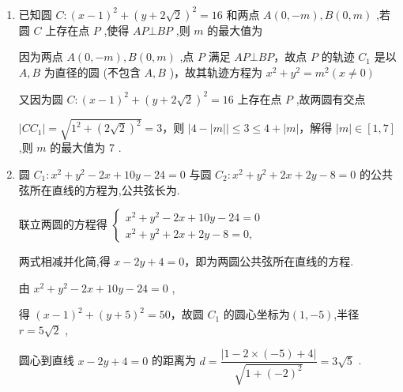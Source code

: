 \begin{enumerate}
\begin{enumerate}
\begin{jieda}
            显然 $\left| {O{C}_{2}}\right|  \geq  \left| {OP}\right|$ ,当且仅当点 ${C}_{2}$ 与点 $P$ 重合时取 “ $=$ ” ,所以 ${\left( {r}_{2}\right) }_{\max } = {r}_{1} - \left| {OP}\right|  = 3 - 1 = 2$ ,
            
            即圆 ${C}_{2}$ 的半径的最大值是 2.
        \end{jieda}
        \item 已知圆 $C : {\left( x - 1\right) }^{2} + {\left( y + 2\sqrt{2}\right) }^{2} = {16}$ 和两点 $A\left( {0, - m}\right) ,B\left( {0,m}\right)$ ,若圆 $C$ 上存在点 $P$ ,使得 ${AP}\bot {BP}$ ,则 $m$ 的最大值为
        \begin{jieda}
            因为两点 $A\left( {0, - m}\right) ,B\left( {0,m}\right)$ ,点 $P$ 满足 ${AP} \bot  {BP}$，故点 $P$ 的轨迹 ${C}_{1}$ 是以 $A,B$ 为直径的圆 (不包含 $A,B$ )，故其轨迹方程为 ${x}^{2} + {y}^{2} = {m}^{2}\left( {x \neq  0}\right)$
            
            又因为圆 $C : {\left( x - 1\right) }^{2} + {\left( y + 2\sqrt{2}\right) }^{2} = {16}$ 上存在点 $P$ ,故两圆有交点
            
            $\left| {C{C}_{1}}\right|  = \sqrt{{1}^{2} + {\left( 2\sqrt{2}\right) }^{2}} = 3$，则 $| 4 -| m| |\leq  3 \leq  4 + | m|$，解得 $\left| m\right|  \in  \left\lbrack  {1,7}\right\rbrack$ ,则 $m$ 的最大值为 7 .
        \end{jieda}
        \item 圆 ${C}_{1} : {x}^{2} + {y}^{2} - {2x} + {10y} - {24} = 0$ 与圆 ${C}_{2} : {x}^{2} + {y}^{2} + {2x} + {2y} - 8 = 0$ 的公共弦所在直线的方程为,公共弦长为.
        \begin{jieda}
            联立两圆的方程得 $\left\{  \begin{array}{l} {x}^{2} + {y}^{2} - {2x} + {10y} - {24} = 0 \\  {x}^{2} + {y}^{2} + {2x} + {2y} - 8 = 0, \end{array}\right.$
            
            两式相减并化简,得 $x - {2y} + 4 = 0$，即为两圆公共弦所在直线的方程.
            
            由 ${x}^{2} + {y}^{2} - {2x} + {10y} - {24} = 0$ ,
            
            得 ${\left( x - 1\right) }^{2} + {\left( y + 5\right) }^{2} = {50}$，故圆 ${C}_{1}$ 的圆心坐标为$(1, -5)$,半径 $r = 5\sqrt{2}$ ,
            
            圆心到直线 $x - {2y} + 4 = 0$ 的距离为 $d = \dfrac{\left| 1 - 2 \times  \left( -5\right)  + 4\right| }{\sqrt{1 + {\left( -2\right) }^{2}}} = 3\sqrt{5}$ .
            

\end{jieda}
\end{enumerate}
\end{enumerate}
